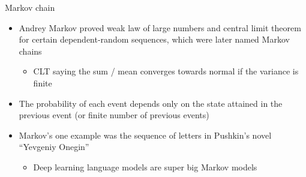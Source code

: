 \documentclass[finnish,english,t]{beamer}
\renewcommand{\emph}[1]{\textcolor{navyblue}{#1}}
\begin{document}
\begin{frame}{Markov chain}

  \begin{itemize}
  \item<1-> \emph{Andrey Markov} proved weak law of large numbers and central
    limit theorem for certain dependent-random sequences, which were
    later named Markov chains
    \begin{itemize}
    \item {CLT saying the sum / mean converges towards normal if the variance is finite}
    \end{itemize}
  \item<2-> The probability of each event depends only on the state
    attained in the previous event (or finite number of previous events)
  \item<3-> Markov's one example was the sequence of letters in
    Pushkin's novel ``Yevgeniy Onegin''
    \begin{itemize}
    \item<4-> {\color{gray} Deep learning language models are super
        big Markov models}
    \end{itemize}
  \end{itemize}

\end{frame}  
\end{document}
